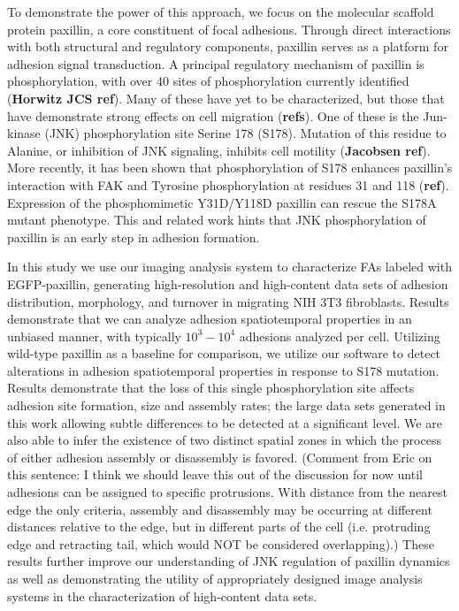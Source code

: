 \documentclass[10pt]{article}
\begin{document}
To demonstrate the power of this approach, we focus on the molecular scaffold
protein paxillin, a core constituent of focal adhesions. Through direct
interactions with both structural and regulatory components, paxillin serves as
a platform for adhesion signal transduction. A principal regulatory mechanism of
paxillin is phosphorylation, with over 40 sites of phosphorylation currently
identified (\textbf{Horwitz JCS ref}). Many of these have yet to be
characterized, but those that have demonstrate strong effects on cell migration
(\textbf{refs}). One of these is the Jun-kinase (JNK) phosphorylation site
Serine 178 (S178). Mutation of this residue to Alanine, or inhibition of JNK
signaling, inhibits cell motility (\textbf{Jacobsen ref}). More recently, it has
been shown that phosphorylation of S178 enhances paxillin's interaction with FAK
and Tyrosine phosphorylation at residues 31 and 118 (\textbf{ref}). Expression
of the phosphomimetic Y31D/Y118D paxillin can rescue the S178A mutant phenotype.
This and related work hints that JNK phosphorylation of paxillin is an early
step in adhesion formation.

In this study we use our imaging analysis system to characterize FAs labeled
with EGFP-paxillin, generating high-resolution and high-content data sets of
adhesion distribution, morphology, and turnover in migrating NIH 3T3
fibroblasts. Results demonstrate that we can analyze adhesion spatiotemporal
properties in an unbiased manner, with typically $10^3-10^4$ adhesions analyzed
per cell. Utilizing wild-type paxillin as a baseline for comparison, we utilize
our software to detect alterations in adhesion spatiotemporal properties in
response to S178 mutation. Results demonstrate that the loss of this single
phosphorylation site affects adhesion site formation, size and assembly rates;
the large data sets generated in this work allowing subtle differences to be
detected at a significant level. We are also able to infer the existence of two
distinct spatial zones in which the process of either adhesion assembly or
disassembly is favored. (Comment from Eric on this sentence: I think we should
leave this out of the discussion for now until adhesions can be assigned to
specific protrusions. With distance from the nearest edge the only criteria,
assembly and disassembly may be occurring at different distances relative to the
edge, but in different parts of the cell (i.e. protruding edge and retracting
tail, which would NOT be considered overlapping).) These results further improve
our understanding of JNK regulation of paxillin dynamics as well as
demonstrating the utility of appropriately designed image analysis systems in
the characterization of high-content data sets.
\end{document}
